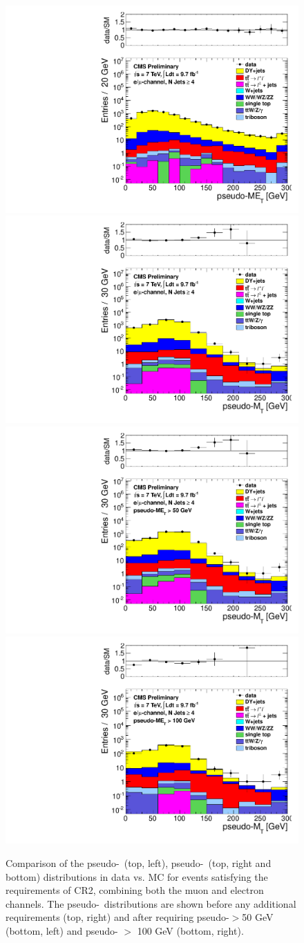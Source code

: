 \begin{figure}[hbt]
  \begin{center}
	\includegraphics[width=0.5\linewidth]{plots/CR2plots/met_lepcor_scaled_nj4_emucomb.pdf}%
	\includegraphics[width=0.5\linewidth]{plots/CR2plots/mt_lepcor_scaled_nj4_emucomb.pdf}
	\includegraphics[width=0.5\linewidth]{plots/CR2plots/mt_lepcor_scaled_met50_nj4_emucomb.pdf}%
	\includegraphics[width=0.5\linewidth]{plots/CR2plots/mt_lepcor_scaled_met100_nj4_emucomb.pdf}

    \caption{
      Comparison of the pseudo-\met\ (top, left), pseudo-\mt\ (top,
      right and bottom) distributions in data vs. MC for events
      satisfying the requirements of CR2, combining both the muon and
      electron channels. The pseudo-\mt\ distributions are shown
      before any additional requirements (top, right) and after
      requiring pseudo-\met $>$50 GeV (bottom, left) and pseudo-\met
      $>$ 100 GeV (bottom, right).
\label{fig:cr2met} 
}  
      \end{center}
\end{figure}

